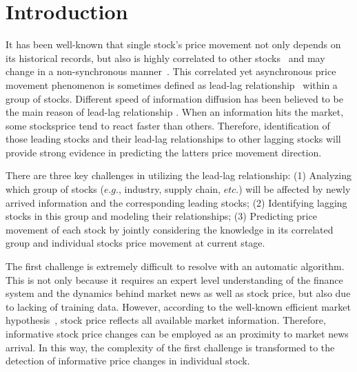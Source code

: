 \documentclass[sigconf,anonymous,review]{acmart}
\renewcommand{\cite}{\citep}
\begin{document}

\maketitle

\section{Introduction}
\label{sec:intro}

It has been well-known that single stock's price movement not only depends on its historical records, but also is highly correlated to other stocks~\cite{lo1990contrarian,mech1993portfolio} and may change in a non-synchronous
manner~\cite{lo1990contrarian,brennan1993investment}. This correlated yet asynchronous price movement phenomenon is sometimes defined as lead-lag relationship~\cite{hou2007industry} within a group of stocks.
Different speed of information diffusion has been believed to be
the main reason of lead-lag relationship
\cite{lo1990contrarian,badrinath1995shepherds,mcqueen1996delayed}.
When an information hits the market, some stocks\textquotesingle price tend to
react faster than others. Therefore, identification of those
leading stocks and their lead-lag relationships to other lagging
stocks will provide strong evidence in predicting the latter\textquotesingle s
price movement direction.

There are three key challenges in utilizing the lead-lag relationship: (1) Analyzing which group of stocks ($e.g.$, industry,
supply chain, $etc.$) will be affected by newly arrived information
and the corresponding leading stocks; (2) Identifying lagging stocks in this group and modeling their relationships; (3) Predicting
price movement of each stock by jointly considering the knowledge in its correlated group and individual stock\textquotesingle s price movement at current stage.

The first challenge is extremely difficult to resolve with an automatic algorithm. This is not only because it requires an expert level understanding of the finance system and the dynamics behind market news as well as stock price, but also due to lacking of training data. However, according to the well-known efficient market hypothesis~\cite{malkiel1970efficient}, stock price reflects all
available market information. Therefore, informative stock price changes can be employed as an proximity to market news arrival. In this way, the complexity of the first challenge is transformed to the detection of informative price changes in individual stock.
\end{document}

